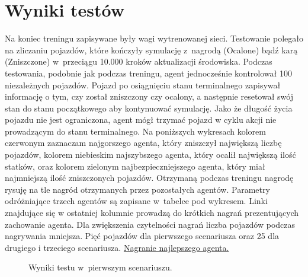 \documentclass[12pt, oneside]{article}
\begin{document}
\section{Wyniki testów}
Na koniec treningu zapisywane były wagi wytrenowanej sieci. Testowanie polegało na zliczaniu pojazdów, które kończyły symulację z~nagrodą (Ocalone) bądź karą (Zniszczone) w~przeciągu 10.000 kroków aktualizacji środowiska. 
Podczas testowania, podobnie jak podczas treningu, agent jednocześnie kontrolował 100 niezależnych pojazdów. Pojazd po osiągnięciu stanu terminalnego zapisywał informację o tym, czy został zniszczony czy ocalony, a następnie resetował swój stan do stanu początkowego aby kontynuować symulację. Jako że długość życia pojazdu nie jest ograniczona, agent mógł trzymać pojazd w cyklu akcji nie prowadzącym do stanu terminalnego. Na poniższych wykresach kolorem czerwonym zaznaczam najgorszego agenta, który zniszczył największą liczbę pojazdów, kolorem niebieskim najszybszego agenta, który ocalił największą ilość statków, oraz kolorem zielonym najbezpieczniejszego agenta, który miał najmniejszą ilość zniszczonych pojazdów. Otrzymaną podczas treningu nagrodę rysuję na tle nagród otrzymanych przez pozostałych agentów. Parametry odróżniające trzech agentów są zapisane w~tabelce pod wykresem. Linki znajdujące się w ostatniej kolumnie prowadzą do krótkich nagrań prezentujących zachowanie agenta. Dla zwiększenia czytelności nagrań liczba pojazdów podczas nagrywania mniejsza. Pięć pojazdów dla pierwszego scenariusza oraz 25 dla drugiego i trzeciego scenariusza. \href{https://www.youtube.com/watch?v=HJj2oh6j5uk}{Nagranie najlepszego agenta.}
\newpage
\begin{figure}[h]
    \caption{Wyniki testu w~pierwszym scenariuszu.}
\end{figure}
\end{document}
